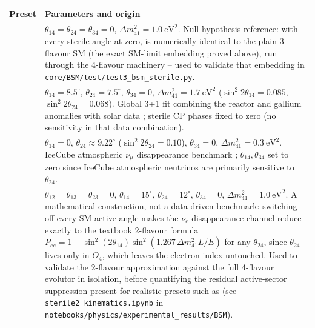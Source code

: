 \begin{implbox}
\begin{center}
\small
\begin{tabular}{@{}ll@{}}
\toprule
Preset & Parameters and origin \\
\midrule
\parbox[t]{3.2cm}{} &
  \parbox[t]{9.4cm}{$\theta_{14}=\theta_{24}=\theta_{34}=0$,
  $\Delta m^2_{41}=1.0\ \mathrm{eV^2}$. Null-hypothesis reference: with
  every sterile angle at zero,  is numerically
  identical to the plain 3-flavour SM (the exact SM-limit embedding proved
  above), run through the 4-flavour machinery -- used to validate that
  embedding in \texttt{core/BSM/test/test3\_bsm\_sterile.py}.} \\[26pt]
\parbox[t]{3.2cm}{} &
  \parbox[t]{9.4cm}{$\theta_{14}=8.5^\circ$, $\theta_{24}=7.5^\circ$,
  $\theta_{34}=0$, $\Delta m^2_{41}=1.7\ \mathrm{eV^2}$
  ($\sin^2 2\theta_{14}=0.085$, $\sin^2 2\theta_{24}=0.068$). Global 3+1
  fit combining the reactor and gallium anomalies with solar data
  \parencite{GariazzoGiuntiLavederLi2017}; sterile CP phases fixed to zero
  (no sensitivity in that data combination).} \\[30pt]
\parbox[t]{3.2cm}{} &
  \parbox[t]{9.4cm}{$\theta_{14}=0$, $\theta_{24}\approx9.22^\circ$
  ($\sin^2 2\theta_{24}=0.10$), $\theta_{34}=0$,
  $\Delta m^2_{41}=0.3\ \mathrm{eV^2}$. IceCube atmospheric $\nu_\mu$
  disappearance benchmark \parencite{IceCube2020SterileNumuDisappearance};
  $\theta_{14},\theta_{34}$ set to zero since IceCube atmospheric neutrinos
  are primarily sensitive to $\theta_{24}$.} \\[26pt]
\parbox[t]{3.2cm}{} &
  \parbox[t]{9.4cm}{$\theta_{12}=\theta_{13}=\theta_{23}=0$,
  $\theta_{14}=15^\circ$, $\theta_{24}=12^\circ$, $\theta_{34}=0$,
  $\Delta m^2_{41}=1.0\ \mathrm{eV^2}$. A mathematical construction, not a
  data-driven benchmark: switching off every SM active angle makes the
  $\nu_e$ disappearance channel reduce exactly to the textbook 2-flavour
  formula $P_{ee}=1-\sin^2(2\theta_{14})\sin^2(1.267\,\Delta m^2_{41}L/E)$
  for any $\theta_{24}$, since $\theta_{24}$ lives only in $O_4$, which
  leaves the electron index untouched. Used to validate the 2-flavour
  approximation against the full 4-flavour evolutor in isolation, before
  quantifying the residual active-sector suppression present for realistic
  presets such as  (see
  \texttt{sterile2\_kinematics.ipynb} in
  \texttt{notebooks/physics/experimental\_results/BSM}).} \\[42pt]
\bottomrule
\end{tabular}
\end{center}
\end{implbox}

